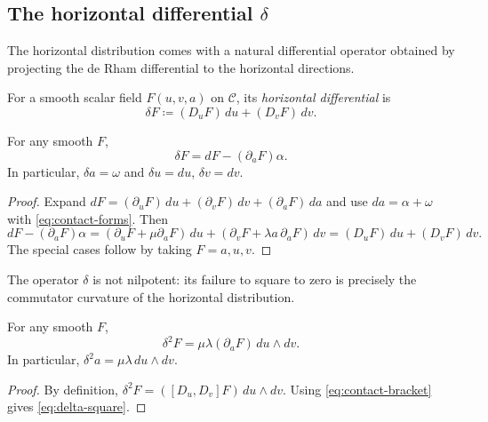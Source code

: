 \subsection{The horizontal differential \texorpdfstring{$\delta$}{delta}}\label{subsec:contact-delta}

The horizontal distribution comes with a natural differential operator obtained by projecting the de Rham differential to the horizontal directions.

\begin{definition}\label{def:delta}
For a smooth scalar field $F(u,v,a)$ on $\mathcal{C}$, its \emph{horizontal differential} is
\begin{equation}\label{eq:delta-def}
\delta F\coloneqq (D_uF)\,du+(D_vF)\,dv.
\end{equation}
\end{definition}

\begin{lemma}\label{lemma:delta-projection}
For any smooth $F$,
\begin{equation}\label{eq:delta-projection}
\delta F=dF-(\partial_aF)\alpha.
\end{equation}
In particular, $\delta a=\omega$ and $\delta u=du$, $\delta v=dv$.
\end{lemma}

\begin{proof}
Expand $dF=(\partial_uF)\,du+(\partial_vF)\,dv+(\partial_aF)\,da$ and use $da=\alpha+\omega$ with \eqref{eq:contact-forms}. Then
\[
dF-(\partial_aF)\alpha
=(\partial_uF+\mu\partial_aF)\,du+(\partial_vF+\lambda a\,\partial_aF)\,dv
=(D_uF)\,du+(D_vF)\,dv.
\]
The special cases follow by taking $F=a,u,v$.
\end{proof}

The operator $\delta$ is not nilpotent: its failure to square to zero is precisely the commutator curvature of the horizontal distribution.

\begin{proposition}\label{prop:delta-square}
For any smooth $F$,
\begin{equation}\label{eq:delta-square}
\delta^2F=\mu\lambda(\partial_aF)\,du\wedge dv.
\end{equation}
In particular, $\delta^2a=\mu\lambda\,du\wedge dv$.
\end{proposition}

\begin{proof}
By definition, $\delta^2F=([D_u,D_v]F)\,du\wedge dv$. Using \eqref{eq:contact-bracket} gives \eqref{eq:delta-square}.
\end{proof}

